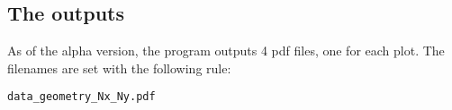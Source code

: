 \subsection{The outputs}
As of the alpha version, the program outputs 4 pdf files, one for each plot.
The filenames are set with the following rule:\\
\begin{center}
      \texttt{data\_geometry\_Nx\_Ny.pdf}
\end{center}

